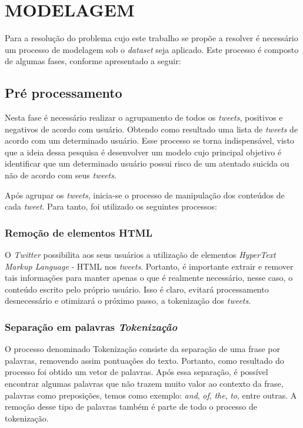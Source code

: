 \chapter{MODELAGEM}

Para a resolução do problema cujo este trabalho se propõe a resolver é necessário um processo de modelagem sob o \textit{dataset} seja aplicado. Este processo é composto de algumas fases, conforme apresentado a seguir:

\section{Pré processamento}

Nesta fase é necessário realizar o agrupamento de todos os \textit{tweets}, positivos e negativos de acordo com usuário. Obtendo como resultado uma lista de \textit{tweets} de acordo com um determinado usuário. Esse processo se torna indispensável, visto que a ideia dessa pesquisa é desenvolver um modelo cujo principal objetivo é identificar que um determinado usuário possui risco de um atentado suicida ou não de acordo com seus \textit{tweets}.

Após agrupar os \textit{tweets}, inicia-se o processo de manipulação dos conteúdos de cada \textit{tweet}. Para tanto, foi utilizado os seguintes processos:

\subsection{Remoção de elementos HTML}

O \textit{Twitter} possibilita aos seus usuários a utilização de elementos  \textit{HyperText Markup Language} - HTML nos \textit{tweets}. Portanto, é importante extrair e remover tais informações para manter apenas o que é realmente necessário, nesse caso, o conteúdo escrito pelo próprio usuário. Isso é claro, evitará processamento desnecessário e otimizará o próximo passo, a tokenização dos \textit{tweets}.

\subsection{Separação em palavras \textit{Tokenização}}

O processo denominado Tokenização consiste da separação de uma frase por palavras, removendo assim pontuações do texto. Portanto, como resultado do processo foi obtido um vetor de palavras. Após essa separação, é possível encontrar algumas palavras que não trazem muito valor ao contexto da frase, palavras como preposições, temos como exemplo: \textit{and}, \textit{of}, \textit{the}, \textit{to}, entre outras. A remoção desse tipo de palavras também é parte de todo o processo de tokenização.

